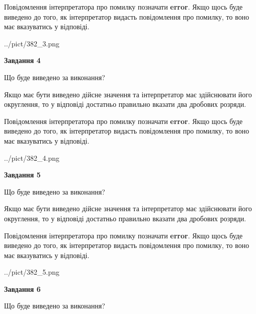\documentclass[12pt, ukrainian]{article}
\begin{document}
{\begin {Large}
Повідомлення інтерпретатора про помилку позначати \textbf{error}.
Якщо щось буде виведено до того, як інтерпретатор видасть повідомлення про помилку, 
то воно має вказуватись у відповіді. \par

\begin{center}
	{../pict/382_3.png}
\end{center}
\newpage

{\begin {center}\textbf{Завдання 4}\end {center}}\par
Що буде виведено за виконання? \par

Якщо має бути виведено дійсне значення та інтерпретатор має здійснювати його округлення, 
то у відповіді достатньо правильно вказати два дробових розряди.

Повідомлення інтерпретатора про помилку позначати \textbf{error}.
Якщо щось буде виведено до того, як інтерпретатор видасть повідомлення про помилку, 
то воно має вказуватись у відповіді. \par

\begin{center}
	{../pict/382_4.png}
\end{center}
\newpage

{\begin {center}\textbf{Завдання 5}\end {center}}\par
Що буде виведено за виконання? \par

Якщо має бути виведено дійсне значення та інтерпретатор має здійснювати його округлення, 
то у відповіді достатньо правильно вказати два дробових розряди.

Повідомлення інтерпретатора про помилку позначати \textbf{error}.
Якщо щось буде виведено до того, як інтерпретатор видасть повідомлення про помилку, 
то воно має вказуватись у відповіді. \par

\begin{center}
	{../pict/382_5.png}
\end{center}
\newpage

{\begin {center}\textbf{Завдання 6}\end {center}}\par
Що буде виведено за виконання? \par


\end{Large}}
\end{document}
